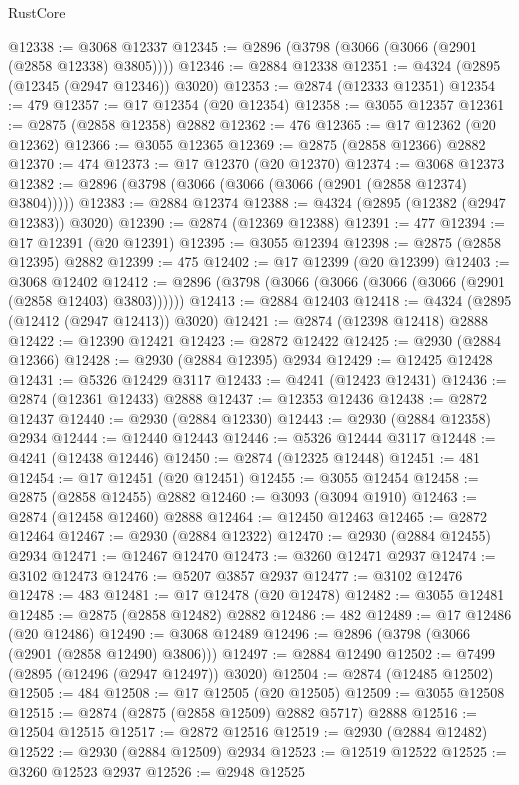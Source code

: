 \begin{lexlean}{RustCore}
\begin{coremodule}
@12338 := @3068 @12337
@12345 := @2896 (@3798 (@3066 (@3066 (@2901 (@2858 @12338) @3805))))
@12346 := @2884 @12338
@12351 := @4324 (@2895 (@12345 (@2947 @12346)) @3020)
@12353 := @2874 (@12333 @12351)
@12354 := 479
@12357 := @17 @12354 (@20 @12354)
@12358 := @3055 @12357
@12361 := @2875 (@2858 @12358) @2882
@12362 := 476
@12365 := @17 @12362 (@20 @12362)
@12366 := @3055 @12365
@12369 := @2875 (@2858 @12366) @2882
@12370 := 474
@12373 := @17 @12370 (@20 @12370)
@12374 := @3068 @12373
@12382 := @2896 (@3798 (@3066 (@3066 (@3066 (@2901 (@2858 @12374) @3804)))))
@12383 := @2884 @12374
@12388 := @4324 (@2895 (@12382 (@2947 @12383)) @3020)
@12390 := @2874 (@12369 @12388)
@12391 := 477
@12394 := @17 @12391 (@20 @12391)
@12395 := @3055 @12394
@12398 := @2875 (@2858 @12395) @2882
@12399 := 475
@12402 := @17 @12399 (@20 @12399)
@12403 := @3068 @12402
@12412 := @2896 (@3798 (@3066 (@3066 (@3066 (@3066 (@2901 (@2858 @12403) @3803))))))
@12413 := @2884 @12403
@12418 := @4324 (@2895 (@12412 (@2947 @12413)) @3020)
@12421 := @2874 (@12398 @12418) @2888
@12422 := @12390 @12421
@12423 := @2872 @12422
@12425 := @2930 (@2884 @12366)
@12428 := @2930 (@2884 @12395) @2934
@12429 := @12425 @12428
@12431 := @5326 @12429 @3117
@12433 := @4241 (@12423 @12431)
@12436 := @2874 (@12361 @12433) @2888
@12437 := @12353 @12436
@12438 := @2872 @12437
@12440 := @2930 (@2884 @12330)
@12443 := @2930 (@2884 @12358) @2934
@12444 := @12440 @12443
@12446 := @5326 @12444 @3117
@12448 := @4241 (@12438 @12446)
@12450 := @2874 (@12325 @12448)
@12451 := 481
@12454 := @17 @12451 (@20 @12451)
@12455 := @3055 @12454
@12458 := @2875 (@2858 @12455) @2882
@12460 := @3093 (@3094 @1910)
@12463 := @2874 (@12458 @12460) @2888
@12464 := @12450 @12463
@12465 := @2872 @12464
@12467 := @2930 (@2884 @12322)
@12470 := @2930 (@2884 @12455) @2934
@12471 := @12467 @12470
@12473 := @3260 @12471 @2937
@12474 := @3102 @12473
@12476 := @5207 @3857 @2937
@12477 := @3102 @12476
@12478 := 483
@12481 := @17 @12478 (@20 @12478)
@12482 := @3055 @12481
@12485 := @2875 (@2858 @12482) @2882
@12486 := 482
@12489 := @17 @12486 (@20 @12486)
@12490 := @3068 @12489
@12496 := @2896 (@3798 (@3066 (@2901 (@2858 @12490) @3806)))
@12497 := @2884 @12490
@12502 := @7499 (@2895 (@12496 (@2947 @12497)) @3020)
@12504 := @2874 (@12485 @12502)
@12505 := 484
@12508 := @17 @12505 (@20 @12505)
@12509 := @3055 @12508
@12515 := @2874 (@2875 (@2858 @12509) @2882 @5717) @2888
@12516 := @12504 @12515
@12517 := @2872 @12516
@12519 := @2930 (@2884 @12482)
@12522 := @2930 (@2884 @12509) @2934
@12523 := @12519 @12522
@12525 := @3260 @12523 @2937
@12526 := @2948 @12525

\end{coremodule}
\end{lexlean}
